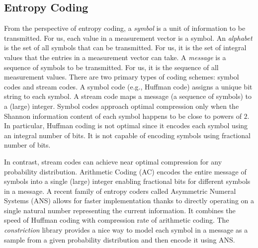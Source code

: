 \subsection{Entropy Coding}
\label{appsec:ec}
From the perspective of entropy coding, a \emph{symbol}
is a unit of information to be transmitted. For us,
each value in a measurement vector is a symbol.
An \emph{alphabet} is the set of all symbols that
can be transmitted. For us, it is the set of integral
values that the entries in a measurement vector can take.
A \emph{message} is a sequence of symbols to be transmitted.
For us, it is the sequence of all measurement values.
There are two primary types of coding schemes: symbol
codes and stream codes. A symbol code (e.g., Huffman code)
assigns a unique bit string to each symbol.
A stream code maps a message (a sequence of symbols)
to a (large) integer. Symbol codes approach optimal
compression only when the Shannon information content
of each symbol happens to be close to powers of $2$.
In particular, Huffman coding is not optimal
since it encodes each symbol using an integral
number of bits. It is not capable of encoding symbols using
fractional number of bits.

In contrast, stream codes can achieve near optimal
compression for any probability distribution.
Arithmetic Coding (AC) \cite{rissanen1979arithmetic,witten1987arithmetic}
encodes the entire message of symbols into a single (large) integer
enabling fractional bits for different symbols in a message.
A recent family of entropy coders called Asymmetric Numeral Systems (ANS)
\cite{duda2013asymmetric}
allows for faster implementation
thanks to directly operating
on a single natural number representing the current information.
It combines the speed of Huffman coding with compression rate
of arithmetic coding.
The \emph{constriction} library \cite{bamler2022constriction} provides
a nice way to model each symbol in a message as a sample from
a given probability distribution and then encode it using ANS.


